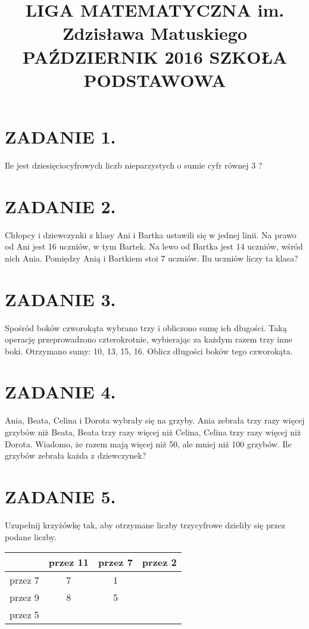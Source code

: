 \documentclass[10pt]{article}
\title{LIGA MATEMATYCZNA im. Zdzisława Matuskiego \\
 PAŹDZIERNIK 2016 SZKOŁA PODSTAWOWA }
\author{}
\date{}
\begin{document}
\maketitle
\section*{ZADANIE 1.}
Ile jest dziesięciocyfrowych liczb nieparzystych o sumie cyfr równej 3 ?

\section*{ZADANIE 2.}
Chłopcy i dziewczynki z klasy Ani i Bartka ustawili się w jednej linii. Na prawo od Ani jest 16 uczniów, w tym Bartek. Na lewo od Bartka jest 14 uczniów, wśród nich Ania. Pomiędzy Anią i Bartkiem stoi 7 uczniów. Ilu uczniów liczy ta klasa?

\section*{ZADANIE 3.}
Spośród boków czworokąta wybrano trzy i obliczono sumę ich długości. Taką operację przeprowadzono czterokrotnie, wybierając za każdym razem trzy inne boki. Otrzymano sumy: 10, 13, 15, 16. Oblicz długości boków tego czworokąta.

\section*{ZADANIE 4.}
Ania, Beata, Celina i Dorota wybrały się na grzyby. Ania zebrała trzy razy więcej grzybów niż Beata, Beata trzy razy więcej niż Celina, Celina trzy razy więcej niż Dorota. Wiadomo, że razem mają więcej niż 50, ale mniej niż 100 grzybów. Ile grzybów zebrała każda z dziewczynek?

\section*{ZADANIE 5.}
Uzupełnij krzyżówkę tak, aby otrzymane liczby trzycyfrowe dzieliły się przez podane liczby.

\begin{center}
\begin{tabular}{|l|c|c|c|}
\hline
 & przez 11 & przez 7 & przez 2 \\
\hline
przez 7 & 7 & 1 &  \\
\hline
przez 9 & 8 & 5 &  \\
\hline
przez 5 &  &  &  \\
\hline
\end{tabular}
\end{center}
\end{document}
